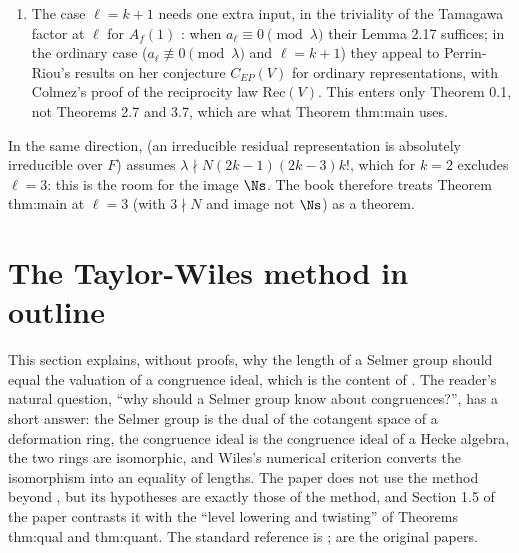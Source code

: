 \begin{remark}[does Diamond, Flach and Guo's theorem cover $\ell=3$ in weight $2$?]
\begin{enumerate}[label=(\arabic*)]
\item The case $\ell=k+1$ needs one extra input, in the triviality of the Tamagawa factor at $\ell$ for $A_f(1)$ \cite[Proposition 2.16]{DFG04}: when $a_\ell\equiv0\pmod\lambda$ their Lemma 2.17 suffices;
in the ordinary case ($a_\ell\not\equiv0\pmod\lambda$ and $\ell=k+1$) they appeal to Perrin-Riou's results on her conjecture $C_{EP}(V)$ for ordinary representations, with Colmez's proof of the
reciprocity law $\mathrm{Rec}(V)$. This enters only Theorem 0.1, not Theorems 2.7 and 3.7, which are what Theorem thm:main uses.
\end{enumerate}
In the same direction, \cite[Lemma 2.5]{DFG04} (an irreducible residual representation is absolutely irreducible over $F$) assumes $\lambda\nmid N(2k-1)(2k-3)k!$, which for $k=2$ excludes
$\ell=3$: this is the room for the image $\Ns$. The book therefore treats Theorem thm:main at $\ell=3$ (with $3\nmid N$ and image not $\Ns$) as a theorem.
\end{remark}

\section{The Taylor-Wiles method in outline}\label{sec:congruence:taylor-wiles}

This section explains, without proofs, why the length of a Selmer group should equal the valuation of a congruence ideal, which is the content of
. The reader's natural question, ``why should a Selmer group know about congruences?'', has a short answer: the Selmer group is the dual of
the cotangent space of a deformation ring, the congruence ideal is the congruence ideal of a Hecke algebra, the two rings are isomorphic, and Wiles's numerical
criterion converts the isomorphism into an equality of lengths. The paper does not use the method beyond , but its hypotheses are exactly those of
the method, and Section 1.5 of the paper contrasts it with the ``level lowering and twisting'' of Theorems thm:qual and thm:quant. The standard reference is \cite{DDT};
\cite{Wiles95,TaylorWiles,Diamond96} are the original papers.

